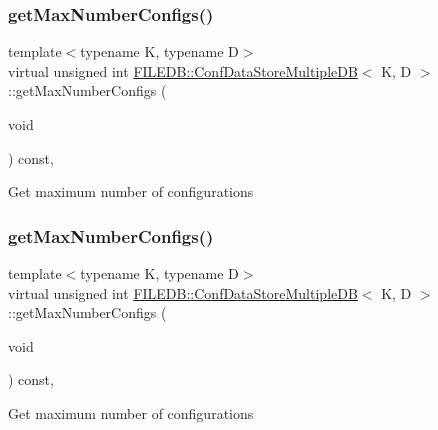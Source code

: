 \subsubsection{\texorpdfstring{getMaxNumberConfigs()}{getMaxNumberConfigs()}\hspace{0.1cm}{\footnotesize\ttfamily [1/2]}}
{\footnotesize\ttfamily template$<$typename K, typename D$>$ \\
virtual unsigned int \mbox{\hyperlink{classFILEDB_1_1ConfDataStoreMultipleDB}{F\+I\+L\+E\+D\+B\+::\+Conf\+Data\+Store\+Multiple\+DB}}$<$ K, D $>$\+::get\+Max\+Number\+Configs (\begin{DoxyParamCaption}\item[{void}]{ }\end{DoxyParamCaption}) const\hspace{0.3cm}{\ttfamily [inline]}, {\ttfamily [virtual]}}

Get maximum number of configurations \mbox{\label{classFILEDB_1_1ConfDataStoreMultipleDB_adb7a350dc85ad9c3830e98a0f03b68d7}} 
\subsubsection{\texorpdfstring{getMaxNumberConfigs()}{getMaxNumberConfigs()}\hspace{0.1cm}{\footnotesize\ttfamily [2/2]}}
{\footnotesize\ttfamily template$<$typename K, typename D$>$ \\
virtual unsigned int \mbox{\hyperlink{classFILEDB_1_1ConfDataStoreMultipleDB}{F\+I\+L\+E\+D\+B\+::\+Conf\+Data\+Store\+Multiple\+DB}}$<$ K, D $>$\+::get\+Max\+Number\+Configs (\begin{DoxyParamCaption}\item[{void}]{ }\end{DoxyParamCaption}) const\hspace{0.3cm}{\ttfamily [inline]}, {\ttfamily [virtual]}}

Get maximum number of configurations \mbox{\label{classFILEDB_1_1ConfDataStoreMultipleDB_aa3f101137804c73d44e2d87538acc014}} 
